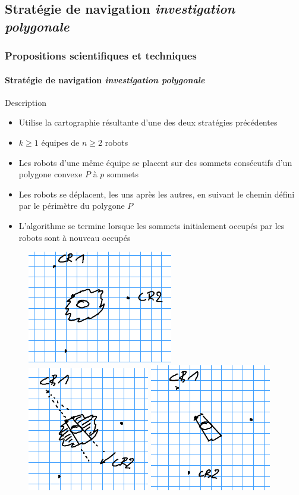 \documentclass{beamer}
\newcommand{\compresslist}{\setlength{\itemsep}{0pt}\setlength{\parskip}{1pt}\setlength{\parsep}{0pt}}
\begin{document}
		\subsection{Stratégie de navigation \textit{investigation polygonale}}
			\begin{frame}
				\frametitle{Propositions scientifiques et techniques}
				\framesubtitle{Stratégie de navigation \textit{investigation polygonale}}
				\vspace{-5pt}
				\tiny
				\begin{block}{Description}\compresslist
					\begin{itemize}
						\item Utilise la cartographie résultante d'une des deux stratégies précédentes
						\item $k \ge 1$ équipes de $n \ge 2$ robots
						\item Les robots d'une même équipe se placent sur des sommets consécutifs d'un polygone convexe $P$ à $p$ sommets
						\item Les robots se déplacent, les uns après les autres, en suivant le chemin défini par le périmètre du polygone $P$
						\item L'algorithme se termine lorsque les sommets initialement occupés par les robots sont à nouveau occupés
					\end{itemize}
				\end{block}
				\vspace{-5pt}
				\begin{figure}
					\centering
					\includegraphics[height=0.2\linewidth]{graphics/triangle_1.png}
					\includegraphics[height=0.2\linewidth]{graphics/triangle_2.png}
					\includegraphics[height=0.2\linewidth]{graphics/triangle_3.png}

\end{figure}
\end{frame}
\end{document}
